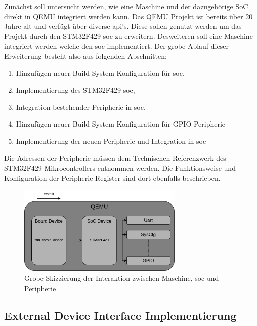 Zunächst soll untersucht werden, wie eine Maschine und der dazugehörige SoC
direkt in QEMU integriert werden kann.
Das QEMU Projekt ist bereits über 20 Jahre alt und verfügt über diverse
\acs{api}'s.
Diese sollen genutzt werden um das Projekt durch den STM32F429-\ac{soc} zu
erweitern.
Desweiteren soll eine Maschine integriert werden welche den \ac{soc}
implementiert.
Der grobe Ablauf dieser Erweiterung besteht also aus folgenden Abschnitten:
\begin{enumerate}
    \item Hinzufügen neuer Build-System Konfiguration für \ac{soc},
    \item Implementierung des STM32F429-\ac{soc},
    \item Integration bestehender Peripherie in \ac{soc},
    \item Hinzufügen neuer Build-System Konfiguration für GPIO-Peripherie
    \item Implementierung der neuen Peripherie und Integration in \ac{soc}
\end{enumerate}
Die Adressen der Peripherie müssen dem Technischen-Referenzwerk des
STM32F429-Mikrocontrollers entnommen werden.
Die Funktionsweise und Konfiguration der Peripherie-Register sind dort
ebenfalls beschrieben.
\begin{figure}[!htb]
    \centering
    \includegraphics[width=0.7\textwidth]{anlagen/bilder/Qemu_Device}
    \caption{Grobe Skizzierung der Interaktion zwischen Maschine, \ac{soc} und Peripherie}
    \label{fig:QemuDeviceErweiterung}
\end{figure}


\subsection{External Device Interface Implementierung}

